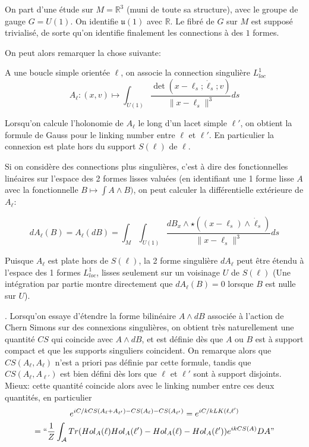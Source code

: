 \documentclass[10pt]{article}
\begin{document}
 On part d'une étude sur $M=\mathbb{R}^3$ (muni de toute sa structure), avec le groupe de gauge $G=U(1)$. On identifie $\mathfrak{u}(1)$ avec $\mathbb{R}$. Le fibré de $G$ sur $M$ est supposé trivialisé, de sorte qu'on identifie finalement les connections à des $1$ formes.

 On peut alors remarquer la chose suivante:

 A une boucle simple orientée $\ell$, on associe la connection singulière $L^1_{loc}$
 \[A_\ell:(x,v)\mapsto \int_{U(1)} \frac{\det(x-\ell_s;\dot{\ell}_s;v)}{\|x-\ell_s\|^3} ds \]


Lorsqu'on calcule l'holonomie de $A_\ell$ le long d'un lacet simple $\ell'$, on obtient la formule de Gauss pour le linking number entre $\ell$ et $\ell'$. En particulier la connexion est plate hors du support $S(\ell)$ de  $\ell$.

Si on considère des connections plus singulières, c'est à dire des fonctionnelles linéaires sur l'espace des 2 formes lisses valuées (en identifiant une 1 forme lisse $A$ avec la fonctionnelle $B\mapsto \int A\wedge B)$, on peut calculer la différentielle extérieure de $A_\ell$:

\[dA_\ell (B)=A_\ell (dB)= \int_M  \int_{U(1)} \frac{dB_x\wedge \star((x-\ell_s)\wedge \dot{\ell}_s) }{\|x-\ell_s\|^3} ds \]

Puisque $A_\ell$ est plate hors de $S(\ell)$, la 2 forme singulière $dA_\ell$ peut être étendu à l'espace des 1 formes $L^1_{loc}$, lisses seulement sur un voisinage $U$ de $S(\ell)$ (Une intégration par partie montre directement que $dA_\ell(B)=0$ lorsque $B$ est nulle sur $U$).






. Lorsqu'on essaye d'étendre la forme bilinéaire $A\wedge dB$ associée à l'action de Chern Simons sur des connexions singulières, on obtient très naturellement une quantité $CS$ qui coincide avec $A\wedge dB$, et est définie dès que $A$ ou $B$ est à support compact et que les supports singuliers coincident. On remarque alors que $CS(A_\ell,A_\ell)$ n'est a priori pas définie par cette formule, tandis que $CS(A_\ell,A_{\ell'})$ est bien défini dès lors que $\ell$ et $\ell'$ sont à support disjoints. Mieux:  cette quantité coincide alors avec le linking number entre ces deux quantités, en particulier
\begin{multline}
   e^{i C/k CS(A_\ell+A_{\ell'})-CS(A_\ell)-CS(A_{\ell'})}=
   e^{i C/k LK(\ell,\ell')}\\
   =  ``\frac{1}{Z}\int_{\mathcal{A}} Tr(Hol_A(\ell)Hol_A(\ell')-Hol_A(\ell)-Hol_A(\ell')) e^{i k CS(A)} DA "
\end{multline}
\end{document}
